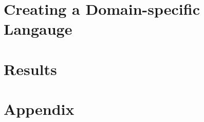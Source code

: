 \part{Creating a Domain-specific Langauge}

\cleardoublepage


\cleardoublepage


\cleardoublepage

\part{Results}


\appendix
\cleardoublepage
\part{Appendix}



\cleardoublepage
\cleardoublepage
\cleardoublepage

\nocite{*}


